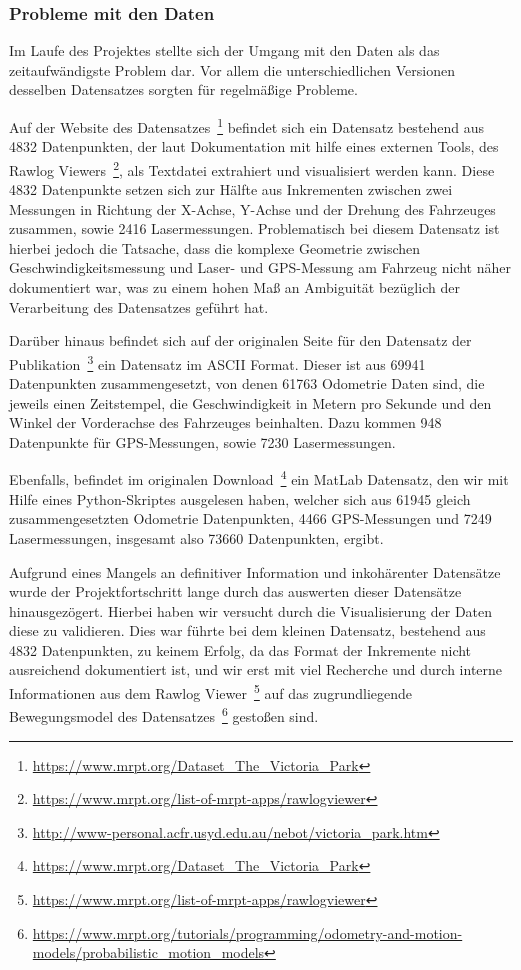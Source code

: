 \documentclass[11pt]{article}
\begin{document}
\subsubsection{Probleme mit den Daten}
Im Laufe des Projektes stellte sich der Umgang mit den Daten als das zeitaufwändigste Problem dar. Vor allem die unterschiedlichen Versionen desselben Datensatzes sorgten für regelmäßige Probleme.

Auf der Website des Datensatzes~\footnote{\url{https://www.mrpt.org/Dataset_The_Victoria_Park}} befindet sich ein Datensatz bestehend aus 4832 Datenpunkten, der laut Dokumentation mit hilfe eines externen Tools, des Rawlog Viewers~\footnote{\url{https://www.mrpt.org/list-of-mrpt-apps/rawlogviewer}}, als Textdatei extrahiert und visualisiert werden kann. Diese 4832 Datenpunkte setzen sich zur Hälfte aus Inkrementen zwischen zwei Messungen in Richtung der X-Achse, Y-Achse und der Drehung des Fahrzeuges zusammen, sowie 2416 Lasermessungen. Problematisch bei diesem Datensatz ist hierbei jedoch die Tatsache, dass die komplexe Geometrie zwischen Geschwindigkeitsmessung und Laser- und GPS-Messung am Fahrzeug nicht näher dokumentiert war, was zu einem hohen Maß an Ambiguität bezüglich der Verarbeitung des Datensatzes geführt hat. 

Darüber hinaus befindet sich auf der originalen Seite für den Datensatz der Publikation~\footnote{\url{http://www-personal.acfr.usyd.edu.au/nebot/victoria_park.htm}} ein Datensatz im ASCII Format. Dieser ist aus 69941 Datenpunkten zusammengesetzt, von denen 61763 Odometrie Daten sind, die jeweils einen Zeitstempel, die Geschwindigkeit in Metern pro Sekunde und den Winkel der Vorderachse des Fahrzeuges beinhalten. Dazu kommen 948 Datenpunkte für GPS-Messungen, sowie 7230 Lasermessungen.

Ebenfalls, befindet im originalen Download~\footnote{\url{https://www.mrpt.org/Dataset_The_Victoria_Park}} ein MatLab Datensatz, den wir mit Hilfe eines Python-Skriptes ausgelesen haben, welcher sich aus 61945 gleich zusammengesetzten Odometrie Datenpunkten, 4466 GPS-Messungen und 7249 Lasermessungen, insgesamt also 73660 Datenpunkten, ergibt.

Aufgrund eines Mangels an definitiver Information und inkohärenter Datensätze wurde der Projektfortschritt lange durch das auswerten dieser Datensätze hinausgezögert. Hierbei haben wir versucht durch die Visualisierung der Daten diese zu validieren. Dies war führte bei dem kleinen Datensatz, bestehend aus 4832 Datenpunkten, zu keinem Erfolg, da das Format der Inkremente nicht ausreichend dokumentiert ist, und wir erst mit viel Recherche und durch interne Informationen aus dem Rawlog Viewer~\footnote{\url{https://www.mrpt.org/list-of-mrpt-apps/rawlogviewer}} auf das zugrundliegende Bewegungsmodel des Datensatzes~\footnote{\url{https://www.mrpt.org/tutorials/programming/odometry-and-motion-models/probabilistic_motion_models}} gestoßen sind.
\end{document}
